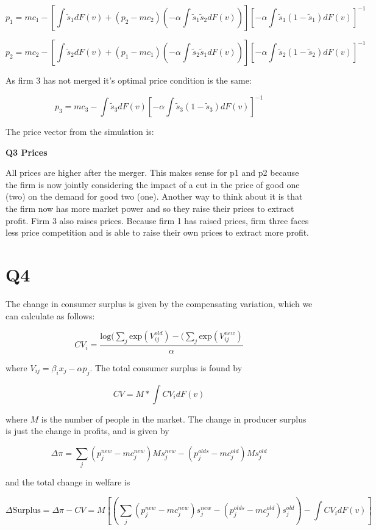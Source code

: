 \documentclass{article}
\newcommand{\1}{\mathbbm{1}}
\begin{document}
$$p_1 = mc_1 - [\int \tilde{s}_1 dF(v) + (p_2 - mc_2)(- \alpha \int \tilde{s}_1\tilde{s}_2dF(v))][-\alpha \int \tilde{s}_1(1-\tilde{s}_1)dF(v)]^{-1}$$


$$p_2 = mc_2 - [\int \tilde{s}_2 dF(v) + (p_1 - mc_1)(- \alpha \int \tilde{s}_2\tilde{s}_1dF(v))][-\alpha \int \tilde{s}_2(1-\tilde{s}_2)dF(v)]^{-1}$$

As firm 3 has not merged it's optimal price condition is the same:

$$p_3 = mc_3 - \int \tilde{s}_3 dF(v)[ -\alpha \int \tilde{s}_3(1-\tilde{s}_3)dF(v)]^{-1}$$

The price vector from the simulation is: 

\begin{center}
	\centering
	\textbf{Q3 Prices}\par\medskip
	\scalebox{1}{
		
	}
\end{center}

All prices are higher after the merger. This makes sense for p1 and p2 because the firm is now jointly considering the impact of a cut in the price of good one (two) on the demand for good two (one). Another way to think about it is that the firm now has more market power and so they raise their prices to extract profit. Firm 3 also raises prices. Because firm 1 has raised prices, firm three faces less price competition and is able to raise their own prices to extract more profit. 

\section{Q4}
The change in consumer surplus is given by the compensating variation, which we can calculate as follows:

$$CV_i = \frac{\text{log}(\sum_j \text{exp}(V_{ij}^{old}) - (\sum_j \text{exp}(V_{ij}^{new})}{\alpha}$$

where $V_{ij} = \beta_ix_j - \alpha p_j$. The total consumer surplus is found by 

$$CV = M*\int CV_i dF(v)$$

where $M$ is the number of people in the market. The change in producer surplus is just the change in profits, and is given by 

$$\Delta \pi = \sum_j (p_j^{new} - mc_j^{new})Ms_j^{new} - (p_j^{olds} - mc_j^{old})Ms_j^{old}$$

and the total change in welfare is 

$$\Delta \text{Surplus} = \Delta \pi - CV = M[(\sum_j (p_j^{new} - mc_j^{new})s_j^{new} - (p_j^{olds} - mc_j^{old})s_j^{old}) - \int CV_i dF(v)] $$
\end{document}
